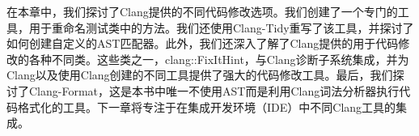 在本章中，我们探讨了Clang提供的不同代码修改选项。我们创建了一个专门的工具，用于重命名测试类中的方法。我们还使用Clang-Tidy重写了该工具，并探讨了如何创建自定义的AST匹配器。此外，我们还深入了解了Clang提供的用于代码修改的各种不同类。这些类之一，clang::FixItHint，与Clang诊断子系统集成，并为Clang以及使用Clang创建的不同工具提供了强大的代码修改工具。最后，我们探讨了Clang-Format，这是本书中唯一不使用AST而是利用Clang词法分析器执行代码格式化的工具。下一章将专注于在集成开发环境（IDE）中不同Clang工具的集成。
